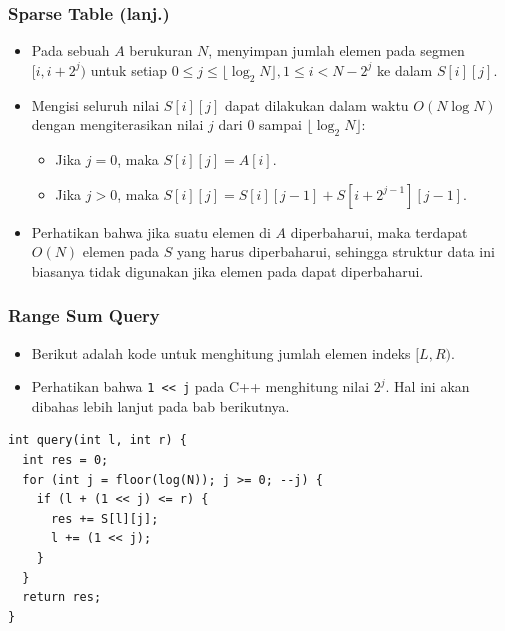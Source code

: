 \begin{frame}
\frametitle{Sparse Table (lanj.)}
\begin{itemize}
  \item Pada sebuah \farray $A$ berukuran $N$, \fSparseTable menyimpan jumlah elemen pada segmen $[i, i + 2^j)$ untuk setiap $0 \le j \le \lfloor \log_{2}N \rfloor, 1 \le i < N - 2^j$ ke dalam $S[i][j]$.
  \item Mengisi seluruh nilai $S[i][j]$ dapat dilakukan dalam waktu $O(N \log N)$ dengan mengiterasikan nilai $j$ dari $0$ sampai $\lfloor \log_{2}N \rfloor$:
  \begin{itemize}
    \item Jika $j = 0$, maka $S[i][j] = A[i]$.
    \item Jika $j > 0$, maka $S[i][j] = S[i][j - 1] + S[i + 2^{j-1}][j - 1]$.
  \end{itemize}
  \item Perhatikan bahwa jika suatu elemen di \farray $A$ diperbaharui, maka terdapat $O(N)$ elemen pada $S$ yang harus diperbaharui, sehingga struktur data ini biasanya tidak digunakan jika elemen pada \farray dapat diperbaharui.
\end{itemize}
\end{frame}

\begin{frame}[fragile]
\frametitle{Range Sum Query}
\begin{itemize}
  \item Berikut adalah kode untuk menghitung jumlah elemen indeks $[L, R)$.
  \item Perhatikan bahwa \lstinline{1 << j} pada C++ menghitung nilai $2^j$. Hal ini akan dibahas lebih lanjut pada bab berikutnya.
\end{itemize}
\begin{lstlisting}
int query(int l, int r) {
  int res = 0;
  for (int j = floor(log(N)); j >= 0; --j) {
    if (l + (1 << j) <= r) {
      res += S[l][j];
      l += (1 << j);
    }
  }
  return res;
}
\end{lstlisting}
\end{frame}


